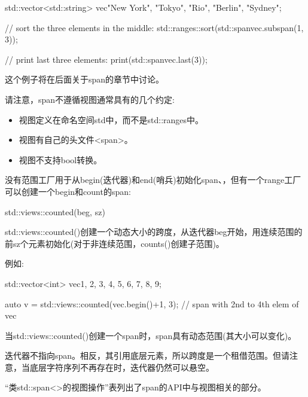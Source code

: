 \begin{cpp}
std::vector<std::string> vec{"New York", "Tokyo", "Rio", "Berlin", "Sydney"};

// sort the three elements in the middle:
std::ranges::sort(std::span{vec}.subspan(1, 3));

// print last three elements:
print(std::span{vec}.last(3));
\end{cpp}

这个例子将在后面关于span的章节中讨论。

请注意，span不遵循视图通常具有的几个约定:

\begin{itemize}
\item
视图定义在命名空间std中，而不是std::ranges中。

\item
视图有自己的头文件<span>。

\item
视图不支持bool转换。
\end{itemize}


没有范围工厂用于从begin(迭代器)和end(哨兵)初始化span、，但有一个range工厂可以创建一个begin和count的span:

\begin{cpp}
std::views::counted(beg, sz)
\end{cpp}

std::views::counted()创建一个动态大小的跨度，从迭代器beg开始，用连续范围的前sz个元素初始化(对于非连续范围，counts()创建子范围)。

例如:

\begin{cpp}
std::vector<int> vec{1, 2, 3, 4, 5, 6, 7, 8, 9};

auto v = std::views::counted(vec.begin()+1, 3); // span with 2nd to 4th elem of vec
\end{cpp}

当std::views::counted()创建一个span时，span具有动态范围(其大小可以变化)。


迭代器不指向span。相反，其引用底层元素，所以跨度是一个租借范围。但请注意，当底层字符序列不再存在时，迭代器仍然可以悬空。


“类std::span<>的视图操作”表列出了span的API中与视图相关的部分。

